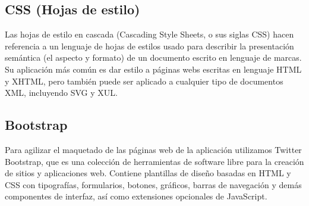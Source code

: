 \subsection{CSS (Hojas de estilo)}
Las hojas de estilo en cascada (Cascading Style Sheets, o sus siglas CSS) hacen referencia a un 
lenguaje de hojas de estilos usado para describir la presentación semántica (el aspecto y formato) de un 
documento escrito en lenguaje de marcas. Su aplicación más común es dar estilo a páginas webs escritas en lenguaje HTML y XHTML, 
pero también puede ser aplicado a cualquier tipo de documentos XML, incluyendo SVG y XUL.

\subsection{Bootstrap}
Para agilizar el maquetado de las páginas web de la aplicación utilizamos Twitter Bootstrap, que es una colección de herramientas de software
libre para la creación de sitios y aplicaciones web. Contiene plantillas de diseño basadas en HTML y CSS con tipografías, 
formularios, botones, gráficos, barras de navegación y demás componentes de interfaz, así como extensiones opcionales de JavaScript.

